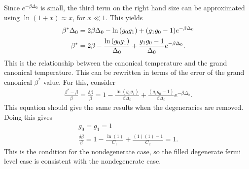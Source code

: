 Since $e^{-\beta\Delta_0}$ is small, the third term on the right hand size can be approximated using $\ln(1+x)\approx x$, for $x\ll1$. This yields
\begin{align}
    \beta^*\Delta_0&=2\beta\Delta_0-\ln\qty(g_0g_1)+(g_1g_0-1)e^{-\beta\Delta_0}\nonumber\\
    \beta^*&=2\beta-\frac{\ln\qty(g_0g_1)}{\Delta_0}+\frac{g_1g_0-1}{\Delta_0}e^{-\beta\Delta_0}.
\end{align} 
This is the relationship between the canonical temperature and the grand canonical temperature. This can be rewritten in terms of the error of the grand canonical $\beta^*$ value. For this, consider 
\begin{align}
    \frac{\beta^*-\beta}{\beta}=\frac{\delta\beta}{\beta}=1-\frac{\ln(g_0g_1)}{\beta\Delta_0}+\frac{(g_1g_0 - 1)}{\beta \Delta_0}e^{-\beta\Delta_0}. \label{filldegen}
\end{align}
This equation should give the same results when the degeneracies are removed. Doing this gives
\begin{gather}
    g_0=g_1=1\nonumber\\
    \frac{\delta\beta}{\beta}=1-\frac{\ln(1)}{C_1}+\frac{(1)(1)-1}{C_2}=1. \label{filldegencheck}
\end{gather}
This is the condition for the nondegenerate case, so the filled degenerate fermi level case is consistent with the nondegenerate case. 

